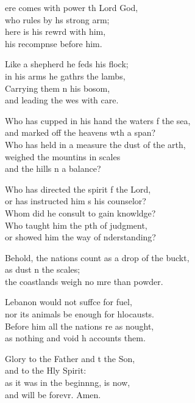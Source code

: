 \settowidth{\versewidth}{Behold, the nations count as a drop of the bucket, +}
\begin{psalmverse}%
  \begin{patverse}
ere comes with power th Lord God,\Med\\
who rules by h\pointup{\i}s strong arm;\\
here is his rewrd with him,\Med\\
his recompnse before him.

Like a shepherd he feds his flock;\Med\\
in his arms he gathrs the lambs,\\
Carrying them \pointup{\i}n his bosom,\Med\\
and leading the wes with care.

Who has cupped in his hand the waters f the sea,\Med\\
and marked off the heavens w\pointup{\i}th a span?\\
Who has held in a measure the dust of the arth,\Flex\\
weighed the mountins in scales\Med\\
and the hills \pointup{\i}n a balance?

Who has directed the spirit f the Lord,\Med\\
or has instructed him s his counselor?\\
Whom did he consult to gain knowldge?\Flex\\
Who taught him the pth of judgment,\Med\\
or showed him the way of nderstanding?

Behold, the nations count as a drop of the buckt,\Flex\\
as dust n the scales;\Med\\
the coastlands weigh no mre than powder.

Lebanon would not suff\pointup{\i}ce for fuel,\Med\\
nor its animals be enough for hlocausts.\\
Before him all the nations re as nought,\Med\\
as nothing and void h accounts them.

Glory to the Father and t the Son,\Med\\
and to the Hly Spirit:\\
as it was in the beginn\pointup{\i}ng, is now,\Med\\
and will be forevr. Amen.
  \end{patverse}
\end{psalmverse}
